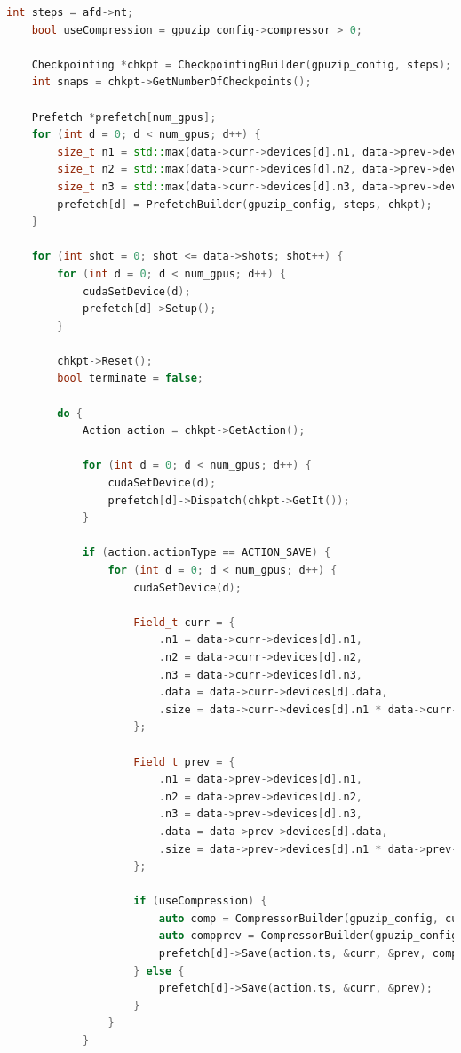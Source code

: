 \documentclass[Ingles,Final]{ic-tese-v3}
\begin{document}
\begin{appendices}{}
\begin{lstlisting}[language=C++, caption={Example of multi-GPU adjoint computation with GPUZIP}, label={lst:adjoint}]
    int steps = afd->nt;
    bool useCompression = gpuzip_config->compressor > 0;

    Checkpointing *chkpt = CheckpointingBuilder(gpuzip_config, steps);
    int snaps = chkpt->GetNumberOfCheckpoints();

    Prefetch *prefetch[num_gpus];
    for (int d = 0; d < num_gpus; d++) {
        size_t n1 = std::max(data->curr->devices[d].n1, data->prev->devices[d].n1);
        size_t n2 = std::max(data->curr->devices[d].n2, data->prev->devices[d].n2);
        size_t n3 = std::max(data->curr->devices[d].n3, data->prev->devices[d].n3);
        prefetch[d] = PrefetchBuilder(gpuzip_config, steps, chkpt); 
    }

    for (int shot = 0; shot <= data->shots; shot++) {
        for (int d = 0; d < num_gpus; d++) {
            cudaSetDevice(d);
            prefetch[d]->Setup();
        }

        chkpt->Reset();
        bool terminate = false;

        do {
            Action action = chkpt->GetAction();

            for (int d = 0; d < num_gpus; d++) {
                cudaSetDevice(d);
                prefetch[d]->Dispatch(chkpt->GetIt());
            }

            if (action.actionType == ACTION_SAVE) {
                for (int d = 0; d < num_gpus; d++) {
                    cudaSetDevice(d);

                    Field_t curr = {
                        .n1 = data->curr->devices[d].n1,
                        .n2 = data->curr->devices[d].n2,
                        .n3 = data->curr->devices[d].n3,
                        .data = data->curr->devices[d].data,
                        .size = data->curr->devices[d].n1 * data->curr->devices[d].n2 * data->curr->devices[d].n3 * sizeof(float)
                    };

                    Field_t prev = {
                        .n1 = data->prev->devices[d].n1,
                        .n2 = data->prev->devices[d].n2,
                        .n3 = data->prev->devices[d].n3,
                        .data = data->prev->devices[d].data,
                        .size = data->prev->devices[d].n1 * data->prev->devices[d].n2 * data->prev->devices[d].n3 * sizeof(float)
                    };

                    if (useCompression) {
                        auto comp = CompressorBuilder(gpuzip_config, curr.n1, curr.n2, curr.n3);
                        auto compprev = CompressorBuilder(gpuzip_config, prev.n1, prev.n2, prev.n3);
                        prefetch[d]->Save(action.ts, &curr, &prev, comp.get(), compprev.get());
                    } else {
                        prefetch[d]->Save(action.ts, &curr, &prev);
                    }
                }
            }


\end{lstlisting}
\end{appendices}
\end{document}
